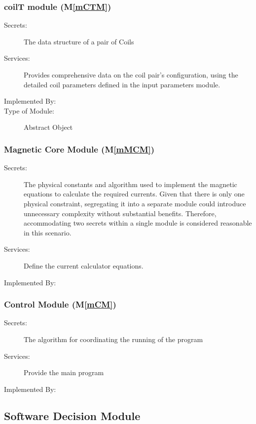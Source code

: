 \documentclass[12pt, titlepage]{article}
\newcommand{\mref}[1]{M\ref{#1}}
\begin{document}
\subsubsection{coilT module (\mref{mCTM})}

\begin{description}
\item[Secrets:]The data structure of a pair of Coils
\item[Services:]Provides comprehensive data on the coil pair's configuration, using the detailed coil parameters defined in the input parameters module. 
\item[Implemented By:] \progname 
\item[Type of Module:] Abstract Object
\end{description}

\subsubsection{Magnetic Core Module (\mref{mMCM})}

\begin{description}
\item[Secrets:]The physical constants and algorithm used to implement the magnetic equations to calculate the required currents. Given that there is only one physical constraint, segregating it into a separate module could introduce unnecessary complexity without substantial benefits. Therefore, accommodating two secrets within a single module is considered reasonable in this scenario.
\item[Services:] Define the current calculator equations.
\item[Implemented By:] \progname 
\end{description}

\subsubsection{Control Module (\mref{mCM})}

\begin{description}
\item[Secrets:]The algorithm for coordinating the running of the program
\item[Services:]Provide the main program
\item[Implemented By:] \progname 
\end{description}



\subsection{Software Decision Module}
\end{document}
